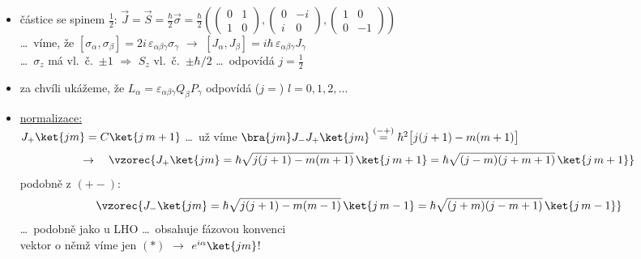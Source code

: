 \begin{priklad}[PŘ:]
\begin{itemize}[nosep]
  \item částice se spinem $\frac12$: \quad
        $\vec J = \vec S = \frac{\hbar}{2}\vec\sigma = \frac{\hbar}{2}\left(\begin{pmatrix}0&1\\1&0\end{pmatrix},\begin{pmatrix}0&-i\\ i&0\end{pmatrix},\begin{pmatrix}1&0\\0&-1\end{pmatrix}\right)$ \\
        \dots\ víme, že \quad $[\sigma_\alpha,\sigma_\beta] = 2i\,\varepsilon_{\alpha\beta\gamma}\sigma_\gamma$ \quad $\to$ \quad $[J_\alpha,J_\beta] = i\hbar\,\varepsilon_{\alpha\beta\gamma}J_\gamma$ \\
        \dots\ $\sigma_z$ má vl.\ č.\ $\pm 1$ $\Rightarrow$ $S_z$ vl.\ č.\ $\pm\hbar/2$ \quad \dots\ odpovídá $j = \frac12$
  \item za chvíli ukážeme, že $L_\alpha = \varepsilon_{\alpha\beta\gamma}Q_\beta P_\gamma$ odpovídá ($j =$) $l = 0,1,2,\dots$
\end{itemize}
\end{priklad}

\begin{itemize}
  \item \underline{normalizace:} \\
  \quad $J_+\ket{jm} = C\ket{j\,m+1}$ \quad \dots\ už víme $\bra{jm}J_-J_+\ket{jm} \overset{(-+)}{=} \hbar^2\big[j(j+1) - m(m+1)\big]$
  \[
    \to\quad \vzorec{J_+\ket{jm} = \hbar\sqrt{j(j+1) - m(m+1)}\,\ket{j\,m+1} = \hbar\sqrt{(j-m)(j+m+1)}\,\ket{j\,m+1}}
  \]
  podobně z $(+-)$:
  \[
    \vzorec{J_-\ket{jm} = \hbar\sqrt{j(j+1) - m(m-1)}\,\ket{j\,m-1} = \hbar\sqrt{(j+m)(j-m+1)}\,\ket{j\,m-1}}
  \]
  \dots\ podobně jako u LHO \dots\ obsahuje fázovou konvenci \\
  vektor o němž víme jen $(*)$ $\to$ $e^{i\alpha}\ket{jm}$! \quad {}
\end{itemize}


